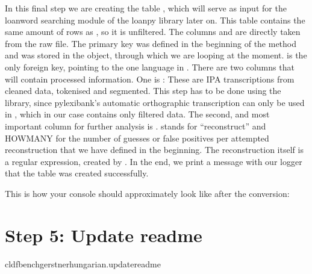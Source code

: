 \documentclass[letterpaper,10pt,english]{sphinxmanual}
\begin{document}
{{{{\sphinxAtStartPar
In this final step we are creating the table , which
will serve as input for the loanword searching module of the loanpy library
later on. This
table contains the same amount of rows as , so
it is unfiltered. The columns    and 
are directly taken from the raw file. The primary key  was
defined in the beginning of the  method and was stored in the
 object, through which we are looping at the moment. 
is the only foreign key, pointing to the one language in
. There are two columns that will contain processed
information. One is : These are IPA transcriptions from cleaned
data, tokenised and segmented. This
step has to be done using the 
library, since pylexibank’s automatic orthographic transcription can only be
used in , which in our case contains only filtered data.
The second, and most important column for further analysis is .
 stands for “reconstruct” and HOWMANY for the number of guesses or false
positives per attempted reconstruction that we have defined in the beginning.
The reconstruction itself is a regular
expression, created by .
In the end, we print a message with our logger that the table was created
successfully.

\sphinxAtStartPar
This is how your console should approximately look like after the conversion:

\noindent{}


\section{Step 5: Update readme}
\label{\detokenize{mkcldf:step-5-update-readme}}
\begin{sphinxVerbatim}[commandchars=\\\{\}]
cldfbenchgerstnerhungarian.update\PYGZus{}readme
\end{sphinxVerbatim}

}}}}
\end{document}
